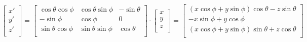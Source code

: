\documentclass[12pt]{article}
\begin{document}
\[
\begin{bmatrix}
x' \\
y' \\
z' \\
\end{bmatrix}
=
\begin{bmatrix}
\cos\theta\cos\phi & \cos\theta\sin\phi & -\sin\theta \\
-\sin\phi & \cos\phi & 0 \\
\sin\theta\cos\phi & \sin\theta\sin\phi & \cos\theta \\
\end{bmatrix}
\cdot
\begin{bmatrix}
x \\
y \\
z \\
\end{bmatrix}
=
\begin{bmatrix}
\left(x\cos\phi+y\sin\phi\right)\cos\theta-z\sin\theta \\
-x\sin\phi+y\cos\phi \\
\left(x\cos\phi+y\sin\phi\right)\sin\theta+z\cos\theta \\
\end{bmatrix}
\]
\end{document}
